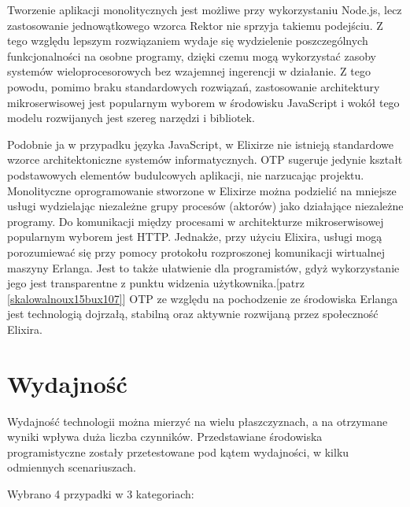 \documentclass[12pt,twoside]{article}
\begin{document}
Tworzenie aplikacji monolitycznych jest możliwe przy wykorzystaniu
Node.js, lecz zastosowanie jednowątkowego wzorca Rektor nie sprzyja
takiemu podejściu. Z tego względu lepszym rozwiązaniem wydaje się
wydzielenie poszczególnych funkcjonalności na osobne programy, dzięki
czemu mogą wykorzystać zasoby systemów wieloprocesorowych bez wzajemnej
ingerencji w działanie. Z tego powodu, pomimo braku standardowych
rozwiązań, zastosowanie architektury mikroserwisowej jest popularnym
wyborem w środowisku JavaScript i wokół tego modelu rozwijanych jest
szereg narzędzi i bibliotek.

Podobnie ja w przypadku języka JavaScript, w Elixirze nie istnieją
standardowe wzorce architektoniczne systemów informatycznych. OTP
sugeruje jedynie kształt podstawowych elementów budulcowych aplikacji,
nie narzucając projektu. Monolityczne oprogramowanie stworzone w
Elixirze można podzielić na mniejsze usługi wydzielając niezależne grupy
procesów (aktorów) jako działające niezależne programy. Do komunikacji
między procesami w architekturze mikroserwisowej popularnym wyborem jest
HTTP. Jednakże, przy użyciu Elixira, usługi mogą porozumiewać się przy
pomocy protokołu rozproszonej komunikacji wirtualnej maszyny Erlanga.
Jest to także ułatwienie dla programistów, gdyż wykorzystanie jego jest
transparentne z punktu widzenia użytkownika.{[}patrz
\ref{skalowalnoux15bux107}{]} OTP ze względu na pochodzenie ze
środowiska Erlanga jest technologią dojrzałą, stabilną oraz aktywnie
rozwijaną przez społeczność Elixira. \autocite{valim2015microservices}
\clearpage{}
	\clearpage{}\section{Wydajność}\label{wydajnoux15bux107}

Wydajność technologii można mierzyć na wielu płaszczyznach, a na
otrzymane wyniki wpływa duża liczba czynników. Przedstawiane środowiska
programistyczne zostały przetestowane pod kątem wydajności, w kilku
odmiennych scenariuszach.

Wybrano 4 przypadki w 3 kategoriach:
\end{document}
